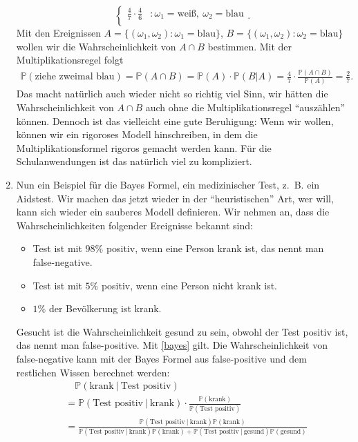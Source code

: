 \begin{beispiel}
\begin{enumerate}[label=(\roman*)]
\[\begin{cases}
		\frac{4}{7} \cdot \frac{4}{6}&: \omega_1 = \text{weiß}, \: \omega_2 = \text{blau}\\
		\end{cases}. \]
		Mit den Ereignissen 		
		$A = \{ (\omega_1, \omega_2)\colon \omega_1 = \text{blau} \}$, $B = \{ (\omega_1, \omega_2)\colon \omega_2 = \text{blau} \}$
		wollen wir die Wahrscheinlichkeit von $A\cap B$ bestimmen. Mit der Multiplikationsregel folgt
		\begin{align*}
			\mathbb{P}(\text{ziehe zweimal blau}) = \mathbb{P}(A \cap B) = \mathbb{P}(A) \cdot \mathbb{P}(B|A) =  \frac{4}{7} \cdot \frac{\mathbb{P}(A \cap B)}{\mathbb{P}(A)} = \frac{2}{7}.
		\end{align*}
		Das macht nat\"urlich auch wieder nicht so richtig viel Sinn, wir h\"atten die Wahrscheinlichkeit von $A\cap B$ auch ohne die Multiplikationsregel \enquote{ausz\"ahlen} k\"onnen. Dennoch ist das vielleicht eine gute Beruhigung: Wenn wir wollen, k\"onnen wir ein rigoroses Modell hinschreiben, in dem die Multiplikationsformel rigoros gemacht werden kann. F\"ur die Schulanwendungen ist das nat\"urlich viel zu kompliziert.		
		\item Nun ein Beispiel f\"ur die Bayes Formel, ein medizinischer Test, \mbox{z. B.} ein Aidstest. Wir machen das jetzt wieder in der \enquote{heuristischen} Art, wer will, kann sich wieder ein sauberes Modell definieren. Wir nehmen an, dass die Wahrscheinlichkeiten folgender Ereignisse bekannt sind:
		\begin{itemize}
			\item Test ist mit $98\%$ positiv, wenn eine Person krank ist, das nennt man false-negative.
			\item Test ist mit $5\%$ positiv, wenn eine Person nicht krank ist.
			\item $1\%$ der Bevölkerung ist krank.
		\end{itemize}
		Gesucht ist die Wahrscheinlichkeit gesund zu sein, obwohl der Test positiv ist, das nennt man false-positive. Mit \ref{bayes} gilt. Die Wahrscheinlichkeit von false-negative kann mit der Bayes Formel aus false-positive und dem restlichen Wissen berechnet werden:
		\begin{align*}
			&\quad \mathbb{P}(\text{krank} \: | \: \text{Test positiv})\\
			 &= \mathbb{P}(\text{Test positiv} \: | \: \text{krank}) \cdot \frac{\mathbb{P}(\text{krank})}{\mathbb{P}(\text{Test positiv})}\\
			&=	\frac{\mathbb{P}(\text{Test positiv} \: | \: \text{krank}) \mathbb{P}(\text{krank})}{\mathbb{P}(\text{Test positiv} \: | \: \text{krank})\mathbb{P}(\text{krank}) + \mathbb{P}(\text{Test positiv} \: | \: \text{gesund})\mathbb{P}(\text{gesund})}\\

\end{align*}
\end{enumerate}
\end{beispiel}
